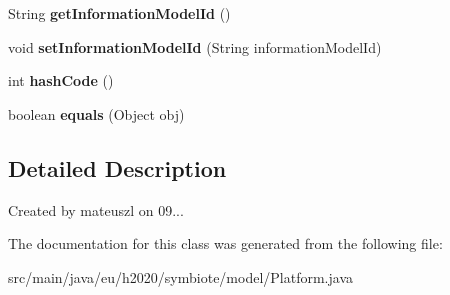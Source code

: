 \begin{DoxyCompactItemize}
String {\bfseries get\+Information\+Model\+Id} ()
\item 
\mbox{\label{classeu_1_1h2020_1_1symbiote_1_1model_1_1Platform_ae3e1cb93bcb289d575f215990d7e9499}} 
void {\bfseries set\+Information\+Model\+Id} (String information\+Model\+Id)
\item 
\mbox{\label{classeu_1_1h2020_1_1symbiote_1_1model_1_1Platform_a3b85d6919db55e5a8584a909a4599953}} 
int {\bfseries hash\+Code} ()
\item 
\mbox{\label{classeu_1_1h2020_1_1symbiote_1_1model_1_1Platform_ab00da56375115817b0594f8865667d30}} 
boolean {\bfseries equals} (Object obj)
\end{DoxyCompactItemize}


\subsection{Detailed Description}
Created by mateuszl on 09... 

The documentation for this class was generated from the following file\+:\begin{DoxyCompactItemize}
\item 
src/main/java/eu/h2020/symbiote/model/Platform.\+java\end{DoxyCompactItemize}
